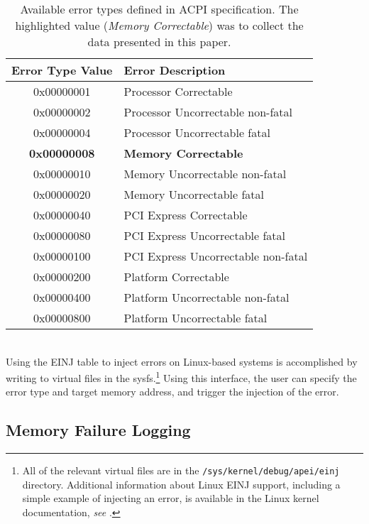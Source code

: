 \begin{table}
\centering
\begin{tabular}{ c l }
\toprule
Error Type Value & Error Description \\
\midrule
 0x00000001 & Processor Correctable\\
 0x00000002 & Processor Uncorrectable non-fatal \\
 0x00000004 & Processor Uncorrectable fatal \\
        {\bf{0x00000008}} & {\bf{Memory Correctable}} \\
 0x00000010 & Memory Uncorrectable non-fatal \\
 0x00000020 & Memory Uncorrectable fatal \\
 0x00000040 & PCI Express Correctable \\
 0x00000080 & PCI Express Uncorrectable fatal \\
 0x00000100 & PCI Express Uncorrectable non-fatal \\
 0x00000200 & Platform Correctable \\
 0x00000400 & Platform Uncorrectable non-fatal \\
 0x00000800 & Platform Uncorrectable fatal \\
\bottomrule
\end{tabular}
\vspace{.6em}
\caption{
        Available error types defined in ACPI specification.  The highlighted value
        (\emph{Memory Correctable}) was to collect the data presented in this paper.
}
\label{tab:einj}
\end{table}

\\
Using the EINJ table to inject errors on Linux-based systems is accomplished by writing to virtual 
files in the sysfs.\footnote{All of the relevant virtual files are in the \texttt{/sys/kernel/debug/apei/einj}
directory.  Additional information about Linux EINJ support, including a simple example of injecting an
error, is available in the Linux kernel documentation, \emph{see} \cite{einj_web}.} Using this interface, 
the user can specify the error type and target memory address, and trigger the injection of the error.

\subsection{Memory Failure Logging}

